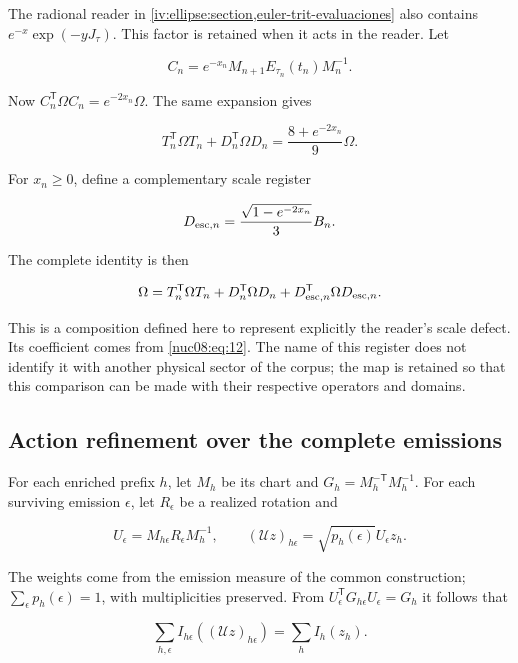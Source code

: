 The radional reader in \cref{iv:ellipse:section,euler-trit-evaluaciones} also contains \(e^{-x}\exp(-yJ_\tau)\). This factor is retained when it acts in the reader. Let

\[
C_n=e^{-x_n}M_{n+1}E_{\tau_n}(t_n)M_n^{-1}.
\]

Now \(C_n^\mathsf T\Omega C_n=e^{-2x_n}\Omega\). The same expansion gives

\begin{equation}
T_n^\mathsf T\Omega T_n+D_n^\mathsf T\Omega D_n
=\frac{8+e^{-2x_n}}9\Omega.
\label{nuc08:eq:12}
\end{equation}

For \(x_n\geq0\), define a complementary scale register

\[
D_{{\rm esc},n}=\frac{\sqrt{1-e^{-2x_n}}}{3}B_n.
\]

The complete identity is then

\begin{equation}
\Omega=T_n^\mathsf T\Omega T_n+D_n^\mathsf T\Omega D_n
+D_{{\rm esc},n}^\mathsf T\Omega D_{{\rm esc},n}.
\label{nuc08:eq:13}
\end{equation}

This is a composition defined here to represent explicitly the reader's scale defect. Its coefficient comes from \eqref{nuc08:eq:12}. The name of this register does not identify it with another physical sector of the corpus; the map is retained so that this comparison can be made with their respective operators and domains.

\subsection{Action refinement over the complete emissions}

For each enriched prefix \(h\), let \(M_h\) be its chart and \(G_h=M_h^{-\mathsf T}M_h^{-1}\). For each surviving emission \(\epsilon\), let \(R_\epsilon\) be a realized rotation and

\[
U_\epsilon=M_{h\epsilon}R_\epsilon M_h^{-1},\qquad
(\mathscr U z)_{h\epsilon}=\sqrt{p_h(\epsilon)}U_\epsilon z_h.
\]

The weights come from the emission measure of the common construction; \(\sum_\epsilon p_h(\epsilon)=1\), with multiplicities preserved. From \(U_\epsilon^\mathsf TG_{h\epsilon}U_\epsilon=G_h\) it follows that

\begin{equation}
\sum_{h,\epsilon}I_{h\epsilon}((\mathscr U z)_{h\epsilon})
=\sum_h I_h(z_h).
\label{nuc08:eq:14}
\end{equation}

